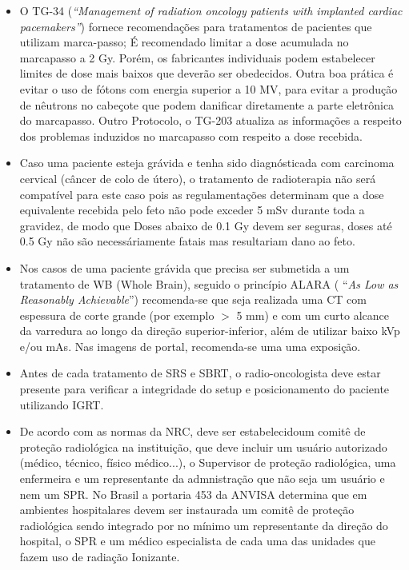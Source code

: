 \documentclass[11pt,a4paper]{article}
\newcounter{exemplo}
\begin{document}
\begin{exemplo}[Qualidade]
\begin{itemize}
        \item O TG-34 (\textit{``Management of radiation oncology patients with implanted cardiac pacemakers''}) fornece recomendações para tratamentos de pacientes que utilizam marca-passo; É recomendado limitar a dose acumulada no marcapasso a 2 Gy. Porém, os fabricantes individuais podem estabelecer limites de dose mais baixos que deverão ser obedecidos. Outra boa prática é evitar o uso de fótons com energia superior a 10 MV, para evitar a produção de nêutrons no cabeçote que podem danificar diretamente a parte eletrônica do marcapasso.  Outro Protocolo, o TG-203 atualiza as informações a respeito dos problemas induzidos no marcapasso com respeito a dose recebida.

        \item Caso uma paciente esteja grávida e tenha sido diagnósticada com carcinoma cervical (câncer de colo de útero), o tratamento de radioterapia não será compatível para este caso pois as regulamentações determinam que a dose equivalente recebida pelo feto não pode exceder 5 mSv durante toda a gravidez, de modo que Doses abaixo de 0.1 Gy devem ser seguras, doses até 0.5 Gy não são necessáriamente fatais mas resultariam dano ao feto. 
        
        \item Nos casos de uma paciente grávida que precisa ser submetida a um tratamento de WB (Whole Brain), seguido o princípio ALARA ( ``\textit{As Low as Reasonably Achievable}'') recomenda-se que seja realizada uma CT com espessura de corte grande (por exemplo $>$ 5 mm) e com um curto alcance da varredura ao longo da direção superior-inferior, além de utilizar baixo kVp e/ou mAs. Nas imagens de portal, recomenda-se uma uma exposição.
        
        \item Antes de cada tratamento de SRS e SBRT, o radio-oncologista deve estar presente para verificar a integridade do setup e posicionamento do paciente utilizando IGRT.

        \item De acordo com as normas da NRC, deve ser estabelecidoum comitê de proteção radiológica na instituição, que deve incluir um usuário autorizado (médico, técnico, físico médico...), o Supervisor de proteção radiológica, uma enfermeira e um representante da admnistração que não seja um usuário e nem um SPR. No Brasil a portaria 453 da ANVISA determina que em ambientes hospitalares devem ser instaurada um comitê de proteção radiológica sendo integrado por no mínimo um representante da direção do hospital, o SPR e um médico especialista de cada uma das unidades que fazem uso de radiação Ionizante. 
        

\end{itemize}
\end{exemplo}
\end{document}
